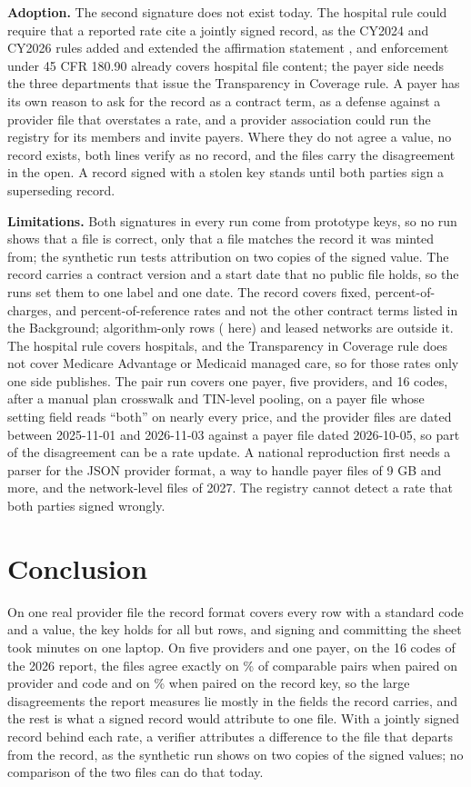 \documentclass[10pt]{article}
\begin{document}
\textbf{Adoption.} The second signature does not exist today. The hospital rule could require that a reported rate cite a jointly signed record, as the CY2024 and CY2026 rules added and extended the affirmation statement \cite{opps2024,opps2026}, and enforcement under 45 CFR 180.90 already covers hospital file content; the payer side needs the three departments that issue the Transparency in Coverage rule. A payer has its own reason to ask for the record as a contract term, as a defense against a provider file that overstates a rate, and a provider association could run the registry for its members and invite payers. Where they do not agree a value, no record exists, both lines verify as no record, and the files carry the disagreement in the open. A record signed with a stolen key stands until both parties sign a superseding record.

\textbf{Limitations.} Both signatures in every run come from prototype keys, so no run shows that a file is correct, only that a file matches the record it was minted from; the synthetic run tests attribution on two copies of the signed value. The record carries a contract version and a start date that no public file holds, so the runs set them to one label and one date. The record covers fixed, percent-of-charges, and percent-of-reference rates and not the other contract terms listed in the Background; algorithm-only rows (\sheetAlgorithm{} here) and leased networks are outside it. The hospital rule covers hospitals, and the Transparency in Coverage rule does not cover Medicare Advantage or Medicaid managed care, so for those rates only one side publishes. The pair run covers one payer, five providers, and 16 codes, after a manual plan crosswalk and TIN-level pooling, on a payer file whose setting field reads ``both'' on nearly every price, and the provider files are dated between 2025-11-01 and 2026-11-03 against a payer file dated 2026-10-05, so part of the disagreement can be a rate update. A national reproduction first needs a parser for the JSON provider format, a way to handle payer files of 9 GB and more, and the network-level files of 2027. The registry cannot detect a rate that both parties signed wrongly.

\section*{Conclusion}

On one real provider file the record format covers every row with a standard code and a value, the key holds for all but \sheetCollisions{} rows, and signing and committing the sheet took \sheetTotalMin{} minutes on one laptop. On five providers and one payer, on the 16 codes of the 2026 report, the files agree exactly on \coarseExact\% of comparable pairs when paired on provider and code and on \pairLineExact\% when paired on the record key, so the large disagreements the report measures lie mostly in the fields the record carries, and the rest is what a signed record would attribute to one file. With a jointly signed record behind each rate, a verifier attributes a difference to the file that departs from the record, as the synthetic run shows on two copies of the signed values; no comparison of the two files can do that today.
\end{document}

